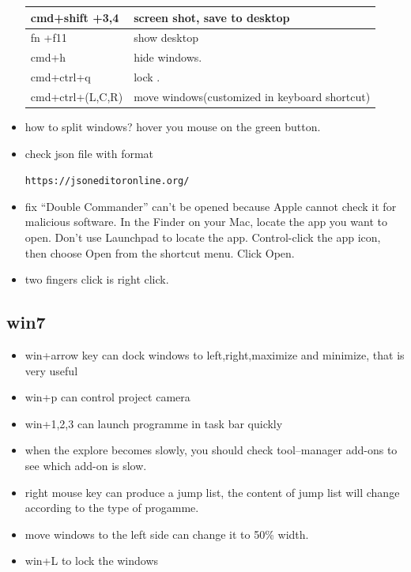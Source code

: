 \documentclass[a4paper,11pt,twoside]{book}
\begin{document}
\begin{itemize}
\begin{tabular}{|p{}|p{}|}
  	\hline
  	cmd+shift +3,4& screen shot, save to desktop  \\
  	
  	\hline
  	fn +f11& show desktop  \\
  	
  	\hline
  	cmd+h & hide windows.  \\
  	
  	\hline
  	cmd+ctrl+q  & lock .  \\
  	
  	\hline	
  	cmd+ctrl+(L,C,R)  & move windows(customized in keyboard shortcut)  \\
  	\hline
  \end{tabular}
  
  \item how to split windows? hover you mouse on the green button. 
  
  \item check json file with format
  
  \verb |https://jsoneditoronline.org/ |
  
  \item fix “Double Commander” can’t be opened because Apple cannot check it for malicious software. In the Finder  on your Mac, locate the app you want to open.
  Don’t use Launchpad to locate the app.
  Control-click the app icon, then choose Open from the shortcut menu. Click Open.
  
  \item two fingers click is right click. 
  
\end{itemize}

\subsection{win7}

\begin{itemize}
\item win+arrow key can dock windows to left,right,maximize and minimize, that is very useful
\item win+p can control project camera
\item win+1,2,3 can launch programme in task bar quickly
\item when the explore becomes slowly, you should check tool--manager add-ons to see which add-on is slow.
\item right mouse key can produce a jump list, the content of jump list will change according to the type of progamme.
\item move windows to the left side can change it to 50\% width.
\item win+L to lock the windows
\end{itemize}
\end{document}
